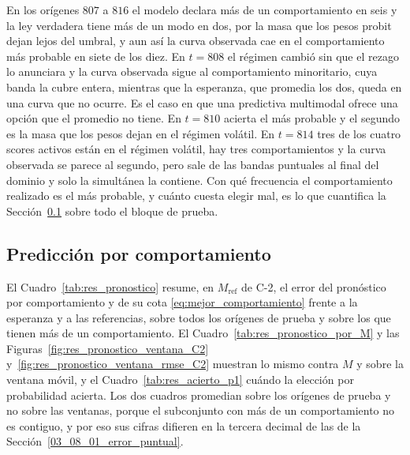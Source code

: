 En los orígenes $807$ a $816$ el modelo declara más de un comportamiento en seis y la ley verdadera tiene más de un modo en dos, por la masa que los pesos probit dejan lejos del umbral, y aun así la curva observada cae en el comportamiento más probable en siete de los diez. En $t = 808$ el régimen cambió sin que el rezago lo anunciara y la curva observada sigue al comportamiento minoritario, cuya banda la cubre entera, mientras que la esperanza, que promedia los dos, queda en una curva que no ocurre. Es el caso en que una predictiva multimodal ofrece una opción que el promedio no tiene. En $t = 810$ acierta el más probable y el segundo es la masa que los pesos dejan en el régimen volátil. En $t = 814$ tres de los cuatro scores activos están en el régimen volátil, hay tres comportamientos y la curva observada se parece al segundo, pero sale de las bandas puntuales al final del dominio y solo la simultánea la contiene. Con qué frecuencia el comportamiento realizado es el más probable, y cuánto cuesta elegir mal, es lo que cuantifica la Sección~\ref{03_08_04_pronostico} sobre todo el bloque de prueba.

\subsection{Predicción por comportamiento}
\label{03_08_04_pronostico}

El Cuadro~\ref{tab:res_pronostico} resume, en $M_{\mathrm{ref}}$ de C-2, el error del pronóstico por comportamiento y de su cota \eqref{eq:mejor_comportamiento} frente a la esperanza y a las referencias, sobre todos los orígenes de prueba y sobre los que tienen más de un comportamiento. El Cuadro~\ref{tab:res_pronostico_por_M} y las Figuras~\ref{fig:res_pronostico_ventana_C2} y~\ref{fig:res_pronostico_ventana_rmse_C2} muestran lo mismo contra $M$ y sobre la ventana móvil, y el Cuadro~\ref{tab:res_acierto_p1} cuándo la elección por probabilidad acierta. Los dos cuadros promedian sobre los orígenes de prueba y no sobre las ventanas, porque el subconjunto con más de un comportamiento no es contiguo, y por eso sus cifras difieren en la tercera decimal de las de la Sección~\ref{03_08_01_error_puntual}.

